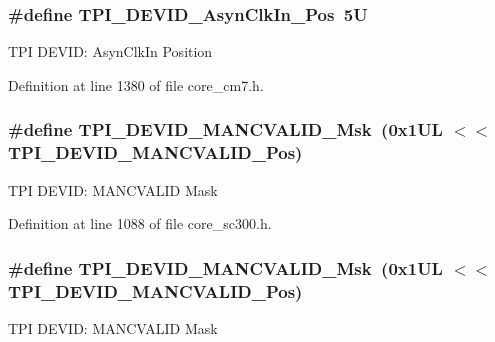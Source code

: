 \subsubsection[{\texorpdfstring{T\+P\+I\+\_\+\+D\+E\+V\+I\+D\+\_\+\+Asyn\+Clk\+In\+\_\+\+Pos}{TPI_DEVID_AsynClkIn_Pos}}]{\setlength{\rightskip}{0pt plus 5cm}\#define T\+P\+I\+\_\+\+D\+E\+V\+I\+D\+\_\+\+Asyn\+Clk\+In\+\_\+\+Pos~5U}\hypertarget{group___c_m_s_i_s___t_p_i_gab382b1296b5efd057be606eb8f768df8}{}\label{group___c_m_s_i_s___t_p_i_gab382b1296b5efd057be606eb8f768df8}
T\+PI D\+E\+V\+ID\+: Asyn\+Clk\+In Position 

Definition at line 1380 of file core\+\_\+cm7.\+h.

\subsubsection[{\texorpdfstring{T\+P\+I\+\_\+\+D\+E\+V\+I\+D\+\_\+\+M\+A\+N\+C\+V\+A\+L\+I\+D\+\_\+\+Msk}{TPI_DEVID_MANCVALID_Msk}}]{\setlength{\rightskip}{0pt plus 5cm}\#define T\+P\+I\+\_\+\+D\+E\+V\+I\+D\+\_\+\+M\+A\+N\+C\+V\+A\+L\+I\+D\+\_\+\+Msk~(0x1\+U\+L $<$$<$ T\+P\+I\+\_\+\+D\+E\+V\+I\+D\+\_\+\+M\+A\+N\+C\+V\+A\+L\+I\+D\+\_\+\+Pos)}\hypertarget{group___c_m_s_i_s___t_p_i_ga4c3ee4b1a34ad1960a6b2d6e7e0ff942}{}\label{group___c_m_s_i_s___t_p_i_ga4c3ee4b1a34ad1960a6b2d6e7e0ff942}
T\+PI D\+E\+V\+ID\+: M\+A\+N\+C\+V\+A\+L\+ID Mask 

Definition at line 1088 of file core\+\_\+sc300.\+h.

\subsubsection[{\texorpdfstring{T\+P\+I\+\_\+\+D\+E\+V\+I\+D\+\_\+\+M\+A\+N\+C\+V\+A\+L\+I\+D\+\_\+\+Msk}{TPI_DEVID_MANCVALID_Msk}}]{\setlength{\rightskip}{0pt plus 5cm}\#define T\+P\+I\+\_\+\+D\+E\+V\+I\+D\+\_\+\+M\+A\+N\+C\+V\+A\+L\+I\+D\+\_\+\+Msk~(0x1\+U\+L $<$$<$ T\+P\+I\+\_\+\+D\+E\+V\+I\+D\+\_\+\+M\+A\+N\+C\+V\+A\+L\+I\+D\+\_\+\+Pos)}\hypertarget{group___c_m_s_i_s___t_p_i_ga4c3ee4b1a34ad1960a6b2d6e7e0ff942}{}\label{group___c_m_s_i_s___t_p_i_ga4c3ee4b1a34ad1960a6b2d6e7e0ff942}
T\+PI D\+E\+V\+ID\+: M\+A\+N\+C\+V\+A\+L\+ID Mask 

